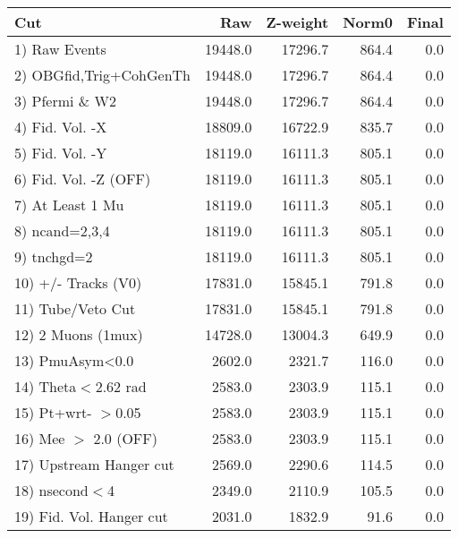  \begin{table}[h!]\centering
 \begin{tabular}{||l||r|r|r|r||}
 \hline
 \hline
 Cut & Raw & Z-weight & Norm0 & Final \\
 \hline
  1) Raw Events           &     19448.0 &     17296.7 &       864.4 &         0.0 \\
  2) OBGfid,Trig+CohGenTh &     19448.0 &     17296.7 &       864.4 &         0.0 \\
  3) Pfermi \& W2         &     19448.0 &     17296.7 &       864.4 &         0.0 \\
  4) Fid. Vol. -X         &     18809.0 &     16722.9 &       835.7 &         0.0 \\
  5) Fid. Vol. -Y         &     18119.0 &     16111.3 &       805.1 &         0.0 \\
  6) Fid. Vol. -Z (OFF)   &     18119.0 &     16111.3 &       805.1 &         0.0 \\
  7) At Least 1 Mu        &     18119.0 &     16111.3 &       805.1 &         0.0 \\
  8) ncand=2,3,4          &     18119.0 &     16111.3 &       805.1 &         0.0 \\
  9) tnchgd=2             &     18119.0 &     16111.3 &       805.1 &         0.0 \\
 10) +/- Tracks (V0)      &     17831.0 &     15845.1 &       791.8 &         0.0 \\
 11) Tube/Veto Cut        &     17831.0 &     15845.1 &       791.8 &         0.0 \\
 12) 2 Muons (1mux)       &     14728.0 &     13004.3 &       649.9 &         0.0 \\
 13) PmuAsym<0.0          &      2602.0 &      2321.7 &       116.0 &         0.0 \\
 14) Theta$<$2.62 rad     &      2583.0 &      2303.9 &       115.1 &         0.0 \\
 15) Pt+wrt- $>$0.05      &      2583.0 &      2303.9 &       115.1 &         0.0 \\
 16) Mee $>$ 2.0  (OFF)   &      2583.0 &      2303.9 &       115.1 &         0.0 \\
 17) Upstream Hanger cut  &      2569.0 &      2290.6 &       114.5 &         0.0 \\
 18) nsecond$<$4          &      2349.0 &      2110.9 &       105.5 &         0.0 \\
 19) Fid. Vol. Hanger cut &      2031.0 &      1832.9 &        91.6 &         0.0 \\

\end{tabular}
\end{table}
